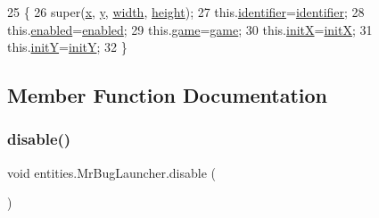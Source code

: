 \begin{DoxyCode}
25                                                                                                            
                                          \{
26         super(\mbox{\hyperlink{classorg_1_1newdawn_1_1slick_1_1geom_1_1_shape_a3e985bfff386c15a4efaad03d8ad60d3}{x}}, \mbox{\hyperlink{classorg_1_1newdawn_1_1slick_1_1geom_1_1_shape_a9f934baded6a1b65ebb69e7e5f80ea00}{y}}, \mbox{\hyperlink{classorg_1_1newdawn_1_1slick_1_1geom_1_1_rectangle_a967e1823f62daf45abb142779d1be62d}{width}}, \mbox{\hyperlink{classorg_1_1newdawn_1_1slick_1_1geom_1_1_rectangle_a3bd010fdce636fc11ed0e0ad4d4b4a0a}{height}});
27         this.\mbox{\hyperlink{classentities_1_1_mr_bug_launcher_aa9cb24696faf408110cd4bcbfb0dd6e0}{identifier}}=\mbox{\hyperlink{classentities_1_1_mr_bug_launcher_aa9cb24696faf408110cd4bcbfb0dd6e0}{identifier}};
28         this.\mbox{\hyperlink{classentities_1_1_mr_bug_launcher_a7a137e2093be1b7ebc830d8c10db42b1}{enabled}}=\mbox{\hyperlink{classentities_1_1_mr_bug_launcher_a7a137e2093be1b7ebc830d8c10db42b1}{enabled}};
29         this.\mbox{\hyperlink{classentities_1_1_mr_bug_launcher_add442b81d844af299fb25599051e4d33}{game}}=\mbox{\hyperlink{classentities_1_1_mr_bug_launcher_add442b81d844af299fb25599051e4d33}{game}};
30         this.\mbox{\hyperlink{classentities_1_1_mr_bug_launcher_aa421d56d0611c8922cdbde7bb29389bd}{initX}}=\mbox{\hyperlink{classentities_1_1_mr_bug_launcher_aa421d56d0611c8922cdbde7bb29389bd}{initX}};
31         this.\mbox{\hyperlink{classentities_1_1_mr_bug_launcher_a328d350bac019351356862476e8d8633}{initY}}=\mbox{\hyperlink{classentities_1_1_mr_bug_launcher_a328d350bac019351356862476e8d8633}{initY}};
32     \}
\end{DoxyCode}


\subsection{Member Function Documentation}
\mbox{\label{classentities_1_1_mr_bug_launcher_a79e2867ec5db217d1b291e9331e7b0ca}} 
\subsubsection{\texorpdfstring{disable()}{disable()}}
{\footnotesize\ttfamily void entities.\+Mr\+Bug\+Launcher.\+disable (\begin{DoxyParamCaption}{ }\end{DoxyParamCaption})\hspace{0.3cm}{\ttfamily [inline]}}



